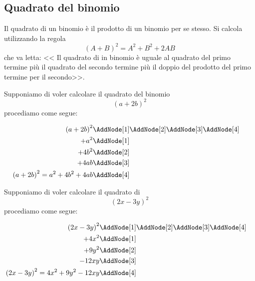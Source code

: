 \subsection{Quadrato del binomio}
Il quadrato di un binomio è il  prodotto di un binomio per se stesso. Si calcola utilizzando la regola\[(A+B)^2=A^2+B^2+2AB\] che va letta: << Il quadrato di in binomio è uguale al quadrato del primo termine più il quadrato del secondo termine più il doppio del prodotto del primo termine per il secondo>>. 
\begin{center}

\end{center}
\begin{esempio}
Supponiamo di voler calcolare il quadrato del binomio \[\left(a+2b\right)^2 \]
procediamo come segue:
\begin{NodesList}
	\begin{align*}
		\left(a+2b\right)^2&\AddNode[1]\AddNode[2]\AddNode[3]\AddNode[4]\\
		+a^2&\AddNode[1]&\\ 
		+4b^2&\AddNode[2]&\\
		+4ab&\AddNode[3]\\
		\left(a+2b\right)^2=a^2+4b^2+4ab&\AddNode[4]
	\end{align*}
\end{NodesList}
\end{esempio}
\begin{esempio}
Supponiamo di voler calcolare il quadrato di \[ \left(2x-3y\right)^2\]
procediamo come segue:
\begin{NodesList}
	\begin{align*}
		\left(2x-3y\right)^2&\AddNode[1]\AddNode[2]\AddNode[3]\AddNode[4]\\
		+4x^2&\AddNode[1]&\\ 
		+9y^2&\AddNode[2]&\\
		-12xy&\AddNode[3]\\
		\left(2x-3y\right)^2=4x^2+9y^2-12xy&\AddNode[4]
	\end{align*}
\end{NodesList}
\end{esempio}

